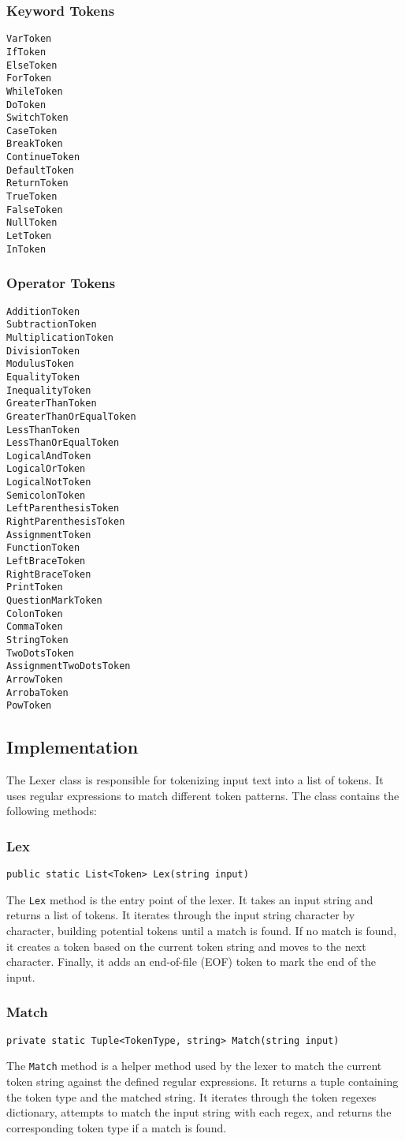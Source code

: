 \documentclass{article}
\begin{document}
\subsubsection{Keyword Tokens}
\begin{lstlisting}
VarToken
IfToken
ElseToken
ForToken
WhileToken
DoToken
SwitchToken
CaseToken
BreakToken
ContinueToken
DefaultToken
ReturnToken
TrueToken
FalseToken
NullToken
LetToken
InToken
\end{lstlisting}
\subsubsection{Operator Tokens}
\begin{lstlisting}
AdditionToken
SubtractionToken
MultiplicationToken
DivisionToken
ModulusToken
EqualityToken
InequalityToken
GreaterThanToken
GreaterThanOrEqualToken
LessThanToken
LessThanOrEqualToken
LogicalAndToken
LogicalOrToken
LogicalNotToken
SemicolonToken
LeftParenthesisToken
RightParenthesisToken
AssignmentToken
FunctionToken
LeftBraceToken
RightBraceToken
PrintToken
QuestionMarkToken
ColonToken
CommaToken
StringToken
TwoDotsToken
AssignmentTwoDotsToken
ArrowToken
ArrobaToken
PowToken
\end{lstlisting}


\subsection{Implementation}
The Lexer class is responsible for tokenizing input text into a list of tokens. It uses regular expressions to match different token patterns. The class contains the following methods:
\subsubsection{Lex}
\begin{lstlisting}[language={[Sharp]C}]
public static List<Token> Lex(string input)
\end{lstlisting}
The \texttt{Lex} method is the entry point of the lexer. It takes an input string and returns a list of tokens. It iterates through the input string character by character, building potential tokens until a match is found. If no match is found, it creates a token based on the current token string and moves to the next character. Finally, it adds an end-of-file (EOF) token to mark the end of the input.

\subsubsection{Match}
\begin{lstlisting}[language={[Sharp]C}]
private static Tuple<TokenType, string> Match(string input)
\end{lstlisting}
The \texttt{Match} method is a helper method used by the lexer to match the current token string against the defined regular expressions. It returns a tuple containing the token type and the matched string. It iterates through the token regexes dictionary, attempts to match the input string with each regex, and returns the corresponding token type if a match is found.
\end{document}
